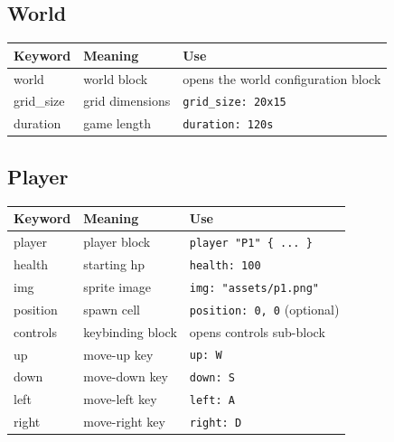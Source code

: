 \documentclass[12pt,a4paper]{article}
\begin{document}
\subsection{World}
\begin{longtable}{KMU}
\toprule
\normalfont\textbf{Keyword} & \textbf{Meaning} & \textbf{Use} \\
\midrule
world      & world block      & opens the world configuration block \\
grid\_size & grid dimensions  & \texttt{grid\_size: 20x15} \\
duration   & game length      & \texttt{duration: 120s} \\
\bottomrule
\end{longtable}

\subsection{Player}
\begin{longtable}{KMU}
\toprule
\normalfont\textbf{Keyword} & \textbf{Meaning} & \textbf{Use} \\
\midrule
player   & player block      & \texttt{player "P1" \{ ... \}} \\
health   & starting hp       & \texttt{health: 100} \\
img      & sprite image      & \texttt{img: "assets/p1.png"} \\
position & spawn cell        & \texttt{position: 0, 0} (optional) \\
controls & keybinding block  & opens controls sub-block \\
up       & move-up key       & \texttt{up: W} \\
down     & move-down key     & \texttt{down: S} \\
left     & move-left key     & \texttt{left: A} \\
right    & move-right key    & \texttt{right: D} \\
\bottomrule
\end{longtable}
\end{document}

